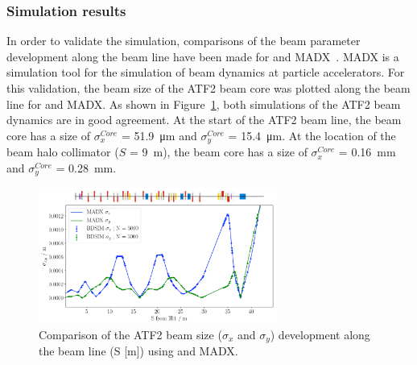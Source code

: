 \subsubsection{Simulation results}
In order to validate the \bdsim simulation, comparisons of the beam parameter development along the beam line have been made for \bdsim and MADX~\cite{MADX}.
MADX is a simulation tool for the simulation of beam dynamics at particle accelerators.
For this validation, the beam size of the ATF2 beam core was plotted along the beam line for \bdsim and MADX.
As shown in Figure~\ref{fig:MADX}, both simulations of the ATF2 beam dynamics are in good agreement.
At the start of the ATF2 beam line, the beam core has a size of $\sigma^{Core}_x$ = \SI{51.9}{\micro\meter} and $\sigma^{Core}_y$ = \SI{15.4}{\micro\meter}.
At the location of the beam halo collimator ($S$ = \SI{9}{\meter}), the beam core has a size of $\sigma^{Core}_x$ = \SI{0.16}{\milli\meter} and $\sigma^{Core}_y$ = \SI{0.28}{\milli\meter}.
\begin{figure}[!h]
\centering
\includegraphics[width=0.7\textwidth]{Figures/ATF/pybdsim_sigma_gmadNuria.png}
\caption[Comparison of the ATF2 beam size development in \bdsim and MADX]{Comparison of the ATF2 beam size ($\sigma_x$ and $\sigma_y$) development along the beam line (S [m]) using \bdsim and MADX.}
\label{fig:MADX}
\end{figure}

